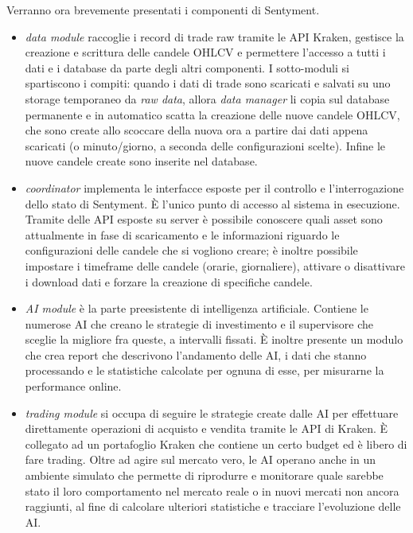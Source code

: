 \documentclass[a4paper,12pt]{report}
\begin{document}
Verranno ora brevemente presentati i componenti di Sentyment.
\begin{itemize}
	\item \textit{data module} raccoglie i record di trade raw tramite le API Kraken, gestisce la creazione e scrittura delle candele OHLCV e permettere l'accesso a tutti i dati e i database da parte degli altri componenti. I sotto-moduli si spartiscono i compiti: quando i dati di trade sono scaricati e salvati su uno storage temporaneo da \textit{raw data}, allora \textit{data manager} li copia sul database permanente e in automatico scatta la creazione delle nuove candele OHLCV, che sono create allo scoccare della nuova ora a partire dai dati appena scaricati (o minuto/giorno, a seconda delle configurazioni scelte). Infine le nuove candele create sono inserite nel database.
	\item \textit{coordinator} implementa le interfacce esposte per il controllo e l'interrogazione dello stato di Sentyment. È l'unico punto di accesso al sistema in esecuzione. Tramite delle API esposte su server è possibile conoscere quali asset sono attualmente in fase di scaricamento e le informazioni riguardo le configurazioni delle candele che si vogliono creare; è inoltre possibile impostare i timeframe delle candele (orarie, giornaliere), attivare o disattivare i download dati e forzare la creazione di specifiche candele.
	\item \textit{AI module} è la parte preesistente di intelligenza artificiale. Contiene le numerose AI che creano le strategie di investimento e il supervisore che sceglie la migliore fra queste, a intervalli fissati. È inoltre presente un modulo che crea report che descrivono l'andamento delle AI, i dati che stanno processando e le statistiche calcolate per ognuna di esse, per misurarne la performance online.
	\item \textit{trading module} si occupa di seguire le strategie create dalle AI per effettuare direttamente operazioni di acquisto e vendita tramite le API di Kraken. È collegato ad un portafoglio Kraken che contiene un certo budget ed è libero di fare trading. Oltre ad agire sul mercato vero, le AI operano anche in un ambiente simulato che permette di riprodurre e monitorare quale sarebbe stato il loro comportamento nel mercato reale o in nuovi mercati non ancora raggiunti, al fine di calcolare ulteriori statistiche e tracciare l'evoluzione delle AI.
\end{itemize}
\end{document}
